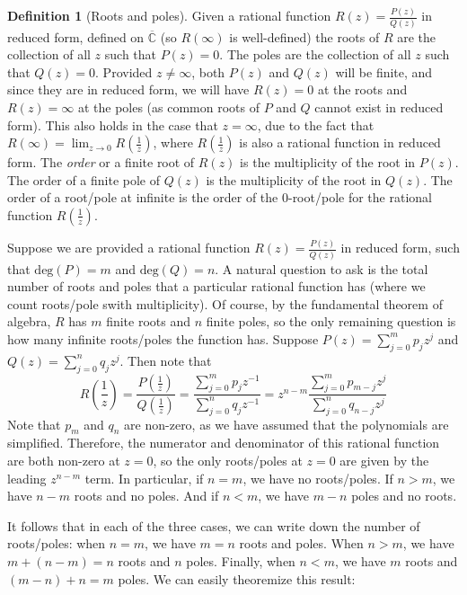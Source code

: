 \documentclass[aps,pra,showpacs,notitlepage,onecolumn,superscriptaddress,nofootinbib]{revtex4-1}
\theoremstyle{definition}
\newtheorem{definition}{Definition}[section]
\begin{document}
\begin{definition}[Roots and poles]
  Given a rational function $R(z) = \frac{P(z)}{Q(z)}$ in reduced form, defined on $\overline{\mathbb{C}}$ (so $R(\infty)$ is well-defined)
  the roots of $R$ are the collection of all $z$ such that $P(z) = 0$. The poles are the collection of all $z$ such that $Q(z) = 0$.
  Provided $z \neq \infty$, both $P(z)$ and $Q(z)$ will be finite, and since they are in reduced form, we will have $R(z) = 0$ at the roots and $R(z) = \infty$ at the poles (as common roots of $P$ and $Q$ cannot exist in reduced form).
  This also holds in the case that $z = \infty$, due to the fact that $R(\infty) = \lim_{z \to 0} R\left(\frac{1}{z}\right)$, where $R\left( \frac{1}{z} \right)$ is also a rational function in reduced form.
  The \emph{order} or a finite root of $R(z)$ is the multiplicity of the root in $P(z)$. The order of a finite pole of $Q(z)$ is the multiplicity of the root in $Q(z)$. The order of a root/pole at infinite is the order of the $0$-root/pole
  for the rational function $R\left(\frac{1}{z}\right)$.
\end{definition}

\noindent Suppose we are provided a rational function $R(z) = \frac{P(z)}{Q(z)}$ in reduced form, such that $\text{deg}(P) = m$ and $\text{deg}(Q) = n$. A natural question to ask is the total number of roots and poles that
a particular rational function has (where we count roots/pole swith multiplicity). Of course, by the fundamental theorem of algebra, $R$ has $m$ finite roots and $n$ finite poles, so the only remaining question is
how many infinite roots/poles the function has. Suppose $P(z) = \sum_{j = 0}^{m} p_j z^{j}$ and $Q(z) = \sum_{j = 0}^{n} q_j z^j$. Then note that
\begin{equation}
  R\left(\frac{1}{z}\right) = \frac{P\left(\frac{1}{z}\right)}{Q\left(\frac{1}{z}\right)} = \frac{\sum_{j = 0}^{m} p_j z^{-1}}{\sum_{j = 0}^{n} q_j z^{-1}} = z^{n - m} \frac{\sum_{j = 0}^{m} p_{m - j} z^{j}}{\sum_{j = 0}^{n} q_{n - j} z^{j}}
\end{equation}
Note that $p_m$ and $q_n$ are non-zero, as we have assumed that the polynomials are simplified. Therefore, the numerator and denominator of this rational function are both non-zero at $z = 0$, so the only roots/poles at $z = 0$ are given
by the leading $z^{n - m}$ term. In particular, if $n = m$, we have no roots/poles. If $n > m$, we have $n - m$ roots and no poles. And if $n < m$, we have $m - n$ poles and no roots.

It follows that in each of the three cases, we can write down the number of roots/poles: when $n = m$, we have $m = n$ roots and poles. When $n > m$, we have $m + (n - m) = n$ roots and $n$ poles. Finally, when $n < m$,
we have $m$ roots and $(m - n) + n = m$ poles. We can easily theoremize this result:
\end{document}
